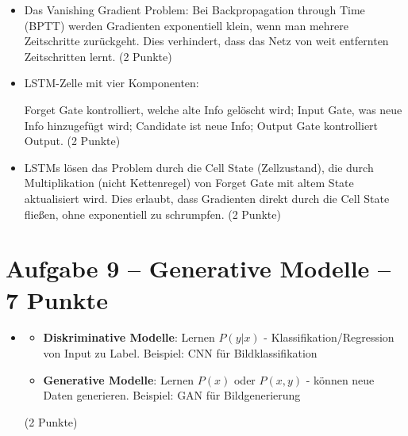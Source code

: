 \begin{itemize}
\item [b)] Das Vanishing Gradient Problem: Bei Backpropagation through Time (BPTT) werden Gradienten exponentiell klein, wenn man mehrere Zeitschritte zurückgeht. Dies verhindert, dass das Netz von weit entfernten Zeitschritten lernt. (2 Punkte)
\end{itemize}

\begin{itemize}
\item [c)] LSTM-Zelle mit vier Komponenten:
\begin{center}
\end{center}
Forget Gate kontrolliert, welche alte Info gelöscht wird; Input Gate, was neue Info hinzugefügt wird; Candidate ist neue Info; Output Gate kontrolliert Output. (2 Punkte)
\end{itemize}

\begin{itemize}
\item [d)] LSTMs lösen das Problem durch die Cell State (Zellzustand), die durch Multiplikation (nicht Kettenregel) von Forget Gate mit altem State aktualisiert wird. Dies erlaubt, dass Gradienten direkt durch die Cell State fließen, ohne exponentiell zu schrumpfen. (2 Punkte)
\end{itemize}

\newpage

\section*{Aufgabe 9 -- Generative Modelle -- 7 Punkte}

\begin{itemize}
\item [a)] 
\begin{itemize}
  \item \textbf{Diskriminative Modelle}: Lernen $P(y|x)$ - Klassifikation/Regression von Input zu Label. Beispiel: CNN für Bildklassifikation
  \item \textbf{Generative Modelle}: Lernen $P(x)$ oder $P(x,y)$ - können neue Daten generieren. Beispiel: GAN für Bildgenerierung
\end{itemize}
(2 Punkte)
\end{itemize}

